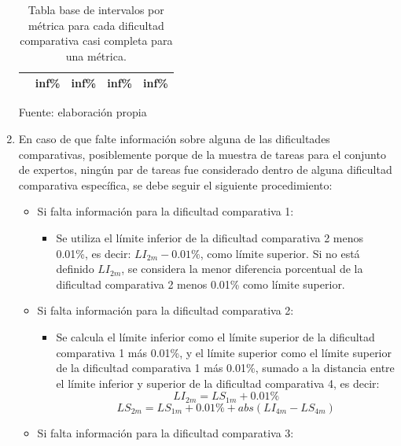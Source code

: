 \documentclass[letterpaper,12pt]{article}
\begin{document}
\begin{enumerate}
\begin{table}[H]
\begin{tabular}{|l|l|l|l|l|}
                                                   & inf\%                            & inf\%                  & inf\%             & inf\%            \\ \hline
          \end{tabular}
          \caption{Tabla base de intervalos por métrica para cada dificultad comparativa casi completa para una métrica.} Fuente: elaboración propia
          \label{tab:base-int-table-3}
        \end{table}
  \item En caso de que falte información sobre alguna de las dificultades comparativas, posiblemente porque de la muestra de tareas para el conjunto de expertos, ningún par de tareas fue considerado dentro de alguna dificultad comparativa específica, se debe seguir el siguiente procedimiento:
        \begin{itemize}
          \item Si falta información para la dificultad comparativa 1:
                \begin{itemize}
                  \item Se utiliza el límite inferior de la dificultad comparativa 2 menos 0.01\%, es decir: $LI_{2m} - 0.01\%$, como límite superior. Si no está definido $LI_{2m}$, se considera la menor diferencia porcentual de la dificultad comparativa 2 menos 0.01\% como límite superior.
                \end{itemize}
          \item Si falta información para la dificultad comparativa 2:
                \begin{itemize}
                  \item Se calcula el límite inferior como el límite superior de la dificultad comparativa 1 más 0.01\%, y el límite superior como el límite superior de la dificultad comparativa 1 más 0.01\%, sumado a la distancia entre el límite inferior y superior de la dificultad comparativa 4, es decir:
                        \begin{equation*}
                          LI_{2m} = LS_{1m} + 0.01\%
                        \end{equation*}
                        \begin{equation*}
                          LS_{2m} = LS_{1m} + 0.01\% + abs(LI_{4m} - LS_{4m})
                        \end{equation*}
                \end{itemize}
          \item Si falta información para la dificultad comparativa 3:

\end{itemize}
\end{enumerate}
\end{document}
